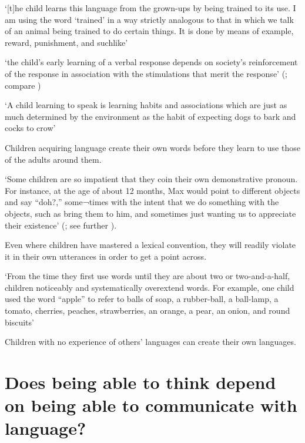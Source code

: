 \documentclass[12pt]{extarticle}
\begin{document}
\begin{multicols}{3}
‘[t]he child learns this language from the grown-ups by being trained to its use. I am using the word ‘trained’ in a way strictly analogous to that in which we talk of an animal being trained to do certain things. It is done by means of example, reward, punishment, and suchlike’
\citep[p.\ 77]{Wittgenstein:1972lj}
 
‘the child’s early learning of a verbal response depends on society's reinforcement of the response in association with the stimulations that merit the response’
(\citep[p.\ 82]{Quine:1960fe}; compare \citep[pp.\ 28--9]{Quine:1974rd})
 
‘A child learning to speak is learning habits and associations which are just as much determined by the environment as the habit of expecting dogs to bark and cocks to crow’
\citep[p.\ 71]{Russell:1921ww}
 
Children acquiring language create their own words before they learn to use those of the adults around them.
 
‘Some children are so impatient that they coin their own demonstrative pronoun. For instance, at the age of about 12 months, Max would point to different objects and say “doh?,” some¬times with the intent that we do something with the objects, such as bring them to him, and sometimes just wanting us to appreciate their existence’
(\citealp[p.\ 122]{Bloom:2000qz}; see further \citealp{Clark:1981bi,Clark:1982hj}).
 
Even where children have mastered a lexical convention, they will readily violate it in their own utterances in order to get a point across.
 
‘From the time they first use words until they are about two or two-and-a-half, children noticeably and systematically overextend words. For example, one child used the word “apple” to refer to balls of soap, a rubber-ball, a ball-lamp, a tomato, cherries, peaches, strawberries, an orange, a pear, an onion, and round biscuits’
\citep[p.\ 35]{Clark:1993bv}
 
Children with no experience of others' languages can create their own languages.
\citep{Kegl:1999es,Senghas:2001zm,Goldin-Meadow:2003pj}
 
 
 
\section{Does being able to think depend on being able to communicate with language?}
 
\begin{enumerate}
 

\end{enumerate}
\end{multicols}
\end{document}
